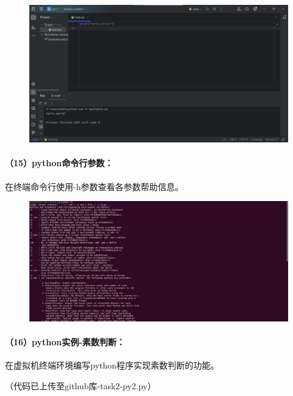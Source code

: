 \documentclass[a4paper, 12pt]{article}
\begin{document}
	\begin{figure}[H]
		\centering
		\includegraphics[width=1\textwidth]{029.jpg}
	\end{figure}
	
	\paragraph{（15）python命令行参数：}
	在终端命令行使用-h参数查看各参数帮助信息。
	
	\begin{figure}[H]
		\centering
		\includegraphics[width=1\textwidth]{030.jpg}
	\end{figure}
	
	\paragraph{（16）python实例-素数判断：}	
	在虚拟机终端环境编写python程序实现素数判断的功能。
	
	（代码已上传至github库-task2-py2.py）
	
\end{document}
